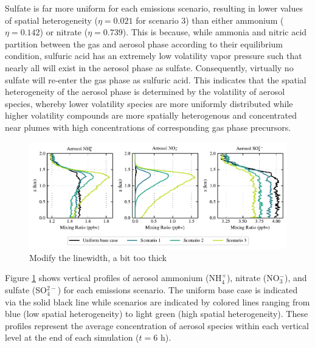 \documentclass[journal abbreviation, manuscript]{copernicus}
\begin{document}
Sulfate is far more uniform for each emissions scenario, resulting in lower values of spatial heterogeneity ($\eta=0.021$ for scenario 3) than either ammonium ($\eta = 0.142$) or nitrate ($\eta=0.739$).  This is because, while ammonia and nitric acid partition between the gas and aerosol phase according to their equilibrium condition, sulfuric acid has an extremely low volatility vapor pressure such that nearly all will exist in the aerosol phase as sulfate. Consequently, virtually no sulfate will re-enter the gas phase as sulfuric acid. This indicates that the spatial heterogeneity of the aerosol phase is determined by the volatility of aerosol species, whereby lower volatility species are more uniformly distributed while higher volatility compounds are more spatially heterogenous and concentrated near plumes with high concentrations of corresponding gas phase precursors.    


\begin{figure}[!h]
	\centering
	\includegraphics[]{figures/aerosol-SNA-vertical-profiles-time36.pdf}
	\caption{Modify the linewidth, a bit too thick}
	\label{fig:vertical-profile-SNA}
\end{figure} 

Figure \ref{fig:vertical-profile-SNA} shows vertical profiles of aerosol ammonium (NH$_4^+$), nitrate (NO$_3^-$), and sulfate (SO$_4^{2-}$) for each emissions scenario. The uniform base case is indicated via the solid black line while scenarios are indicated by colored lines ranging from blue (low spatial heterogeneity) to light green (high spatial heterogeneity). These profiles represent the average concentration of aerosol species within each vertical level at the end of each simulation ($t=6$ h). 
\end{document}
